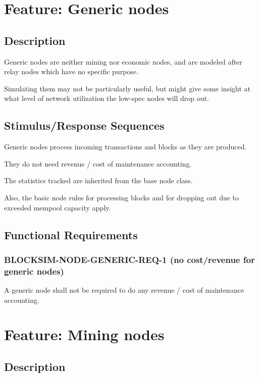 \documentclass{scrreprt}
\begin{document}
  \section{Feature: Generic nodes}

    \subsection{Description}

      Generic nodes are neither mining nor economic nodes, and are modeled
      after relay nodes which have no specific purpose.

      Simulating them may not be particularly useful, but might give some
      insight at what level of network utilization the low-spec nodes will
      drop out.

    \subsection{Stimulus/Response Sequences}

      Generic nodes process incoming transactions and blocks as they are
      produced.

      They do not need revenue / cost of maintenance accounting.

      The statistics tracked are inherited from the base node class.

      Also, the basic node rules for processing blocks and for dropping out due
      to exceeded mempool capacity apply.

    \subsection{Functional Requirements}

      \subsubsection{BLOCKSIM-NODE-GENERIC-REQ-1 (no cost/revenue for generic nodes)}

        A generic node shall not be required to do any revenue / cost of
        maintenance accounting.

  \section{Feature: Mining nodes}

    \subsection{Description}
\end{document}
